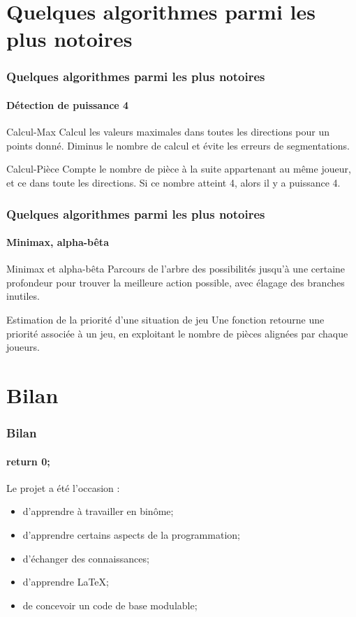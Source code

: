 \documentclass{beamer}
\begin{document}
    \section{Quelques algorithmes parmi les plus notoires}
    \begin{frame}
    \frametitle{Quelques algorithmes parmi les plus notoires}
    \framesubtitle{Détection de puissance 4}
    	\begin{block}{Calcul-Max}
		    Calcul les valeurs maximales dans toutes les directions pour un points donné. Diminus le nombre de calcul et évite les erreurs de segmentations.\\
	\end{block}
	\begin{block}{Calcul-Pièce}
		    Compte le nombre de pièce à la suite appartenant au même joueur, et ce dans toute les directions. Si ce nombre atteint 4, alors il y a puissance 4.\\
	\end{block}
    \end{frame}




    \begin{frame}
    \frametitle{Quelques algorithmes parmi les plus notoires}
    \framesubtitle{Minimax, alpha-bêta}
        \begin{block}{Minimax et alpha-bêta}
            Parcours de l'arbre des possibilités jusqu'à une certaine profondeur pour trouver la meilleure action possible, avec élagage des branches inutiles.
        \end{block}
        \begin{block}{Estimation de la priorité d'une situation de jeu}
            Une fonction retourne une priorité associée à un jeu, en exploitant le nombre de pièces alignées par chaque joueurs.
        \end{block}
    \end{frame}



    \section{Bilan}
    \begin{frame}
    \frametitle{Bilan}
    \framesubtitle{return 0;}
        Le projet a été l'occasion :
        \begin{itemize}
            \item d'apprendre à travailler en binôme;
            \item d'apprendre certains aspects de la programmation;
            \item d'échanger des connaissances;
            \item d'apprendre LaTeX;
            \item de concevoir un code de base modulable;
        \end{itemize}

    \end{frame}



\end{document}
